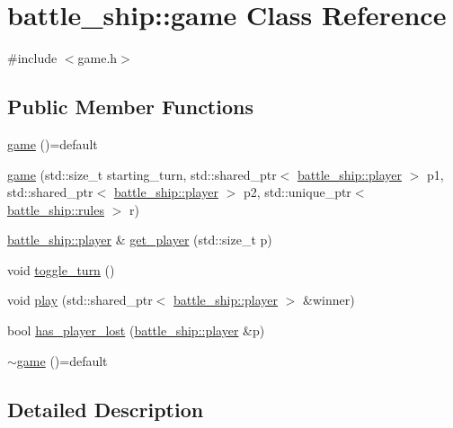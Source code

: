 \hypertarget{classbattle__ship_1_1game}{}\section{battle\+\_\+ship\+:\+:game Class Reference}
\label{classbattle__ship_1_1game}


{\ttfamily \#include $<$game.\+h$>$}

\subsection*{Public Member Functions}
\begin{DoxyCompactItemize}
\item 
\hyperlink{classbattle__ship_1_1game_a3a98cd01dec3c29d91d057049c421c89}{game} ()=default
\item 
\hyperlink{classbattle__ship_1_1game_ab798a2291e0ef511be6d613cc48d26bb}{game} (std\+::size\+\_\+t starting\+\_\+turn, std\+::shared\+\_\+ptr$<$ \hyperlink{classbattle__ship_1_1player}{battle\+\_\+ship\+::player} $>$ p1, std\+::shared\+\_\+ptr$<$ \hyperlink{classbattle__ship_1_1player}{battle\+\_\+ship\+::player} $>$ p2, std\+::unique\+\_\+ptr$<$ \hyperlink{classbattle__ship_1_1rules}{battle\+\_\+ship\+::rules} $>$ r)
\item 
\hyperlink{classbattle__ship_1_1player}{battle\+\_\+ship\+::player} \& \hyperlink{classbattle__ship_1_1game_abdbbd12c9a8b272e2a9fabed8ea90922}{get\+\_\+player} (std\+::size\+\_\+t p)
\item 
void \hyperlink{classbattle__ship_1_1game_a0e5a85f6c1f0cff5e1104545b5222026}{toggle\+\_\+turn} ()
\item 
void \hyperlink{classbattle__ship_1_1game_a2cfee3f6969a0b01243e65870058fb07}{play} (std\+::shared\+\_\+ptr$<$ \hyperlink{classbattle__ship_1_1player}{battle\+\_\+ship\+::player} $>$ \&winner)
\item 
bool \hyperlink{classbattle__ship_1_1game_ac63820a8659c24ad4d69cb5ddd96c6e6}{has\+\_\+player\+\_\+lost} (\hyperlink{classbattle__ship_1_1player}{battle\+\_\+ship\+::player} \&p)
\item 
\hyperlink{classbattle__ship_1_1game_aa95dac5c30c567ae407a3b67ceae324d}{$\sim$game} ()=default
\end{DoxyCompactItemize}


\subsection{Detailed Description}


